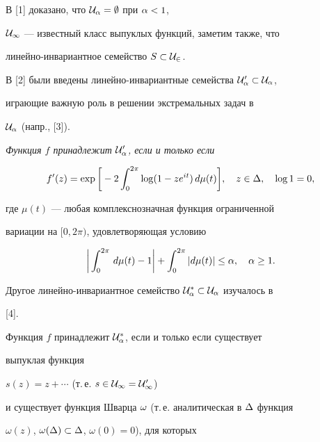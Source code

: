 В [1] доказано, что $\cal U_\alpha =\emptyset$ при $\alpha <1$,


$\cal U_1$ --- известный класс выпуклых функций, заметим также, что


линейно-инвариантное семейство $S\subset\cal U_2$.


 


В [2] были введены линейно-инвариантные семейства $\cal U_\alpha'\subset\cal U_\alpha$,


играющие важную роль в решении экстремальных задач в


$\cal U_\alpha$ (напр., [3]).





{\it Функция $f$ принадлежит $\cal U_\alpha'$, если и только если}


\begin{equation*}


f'(z)=\exp\bigg[-2\int_0^{2\pi}\log (1-ze^{it})\, d\mu(t)\bigg],


\quad z\in\De, \quad \log 1=0,


\end{equation*}


где $\mu(t)$ --- любая комплекснозначная функция ограниченной 


вариации на $[0,2\pi)$, удовлетворяющая условию


\begin{equation*}


\bigg|\int_0^{2\pi}\, d\mu(t)-1\bigg|+\int_0^{2\pi}|


d\mu(t)|\leq \al,\quad


\al\geq 1.


\end{equation*}





Другое линейно-инвариантное семейство $\cal U_\alpha^*\subset\cal U_\alpha$ изучалось в


[4].





Функция $f$ принадлежит $\cal U_\alpha^\ast$, если и только если существует


выпуклая функция


$s(z)=z+\dotsb$ (т.\,е. $s\in\cal U_1=\cal U_1'$)


и существует функция Шварца $\omega$ (т.\,е. аналитическая в $\Delta$ функция


$\omega (z)$, $\omega(\Delta)\subset\Delta$, $\omega(0)=0$), для которых


